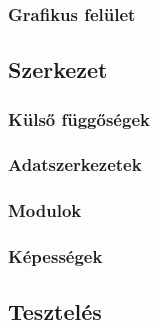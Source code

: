 \documentclass[12pt]{article}
\begin{document}
\subsubsection{Grafikus felület}

\subsection{Szerkezet}

\subsubsection{Külső függőségek}

\subsubsection{Adatszerkezetek}

\subsubsection{Modulok}

\subsubsection{Képességek}

\subsection{Tesztelés}
\end{document}
